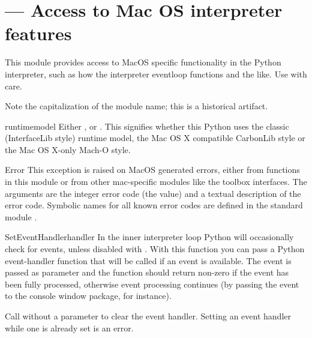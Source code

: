 \section{ ---
         Access to Mac OS interpreter features}



This module provides access to MacOS specific functionality in the
Python interpreter, such as how the interpreter eventloop functions
and the like. Use with care.

Note the capitalization of the module name; this is a historical
artifact.

\begin{datadesc}{runtimemodel}
Either ,  or .  This
signifies whether this Python uses the classic (InterfaceLib style)
runtime model, the Mac OS X compatible CarbonLib style or the Mac OS
X-only Mach-O style.
\end{datadesc}

\begin{excdesc}{Error}
This exception is raised on MacOS generated errors, either from
functions in this module or from other mac-specific modules like the
toolbox interfaces. The arguments are the integer error code (the
 value) and a textual description of the error code.
Symbolic names for all known error codes are defined in the standard
module .
\end{excdesc}

\begin{funcdesc}{SetEventHandler}{handler}
In the inner interpreter loop Python will occasionally check for events,
unless disabled with . With this function you
can pass a Python event-handler function that will be called if an event
is available. The event is passed as parameter and the function should return
non-zero if the event has been fully processed, otherwise event processing
continues (by passing the event to the console window package, for instance).

Call  without a parameter to clear the
event handler. Setting an event handler while one is already set is an
error.
\end{funcdesc}

